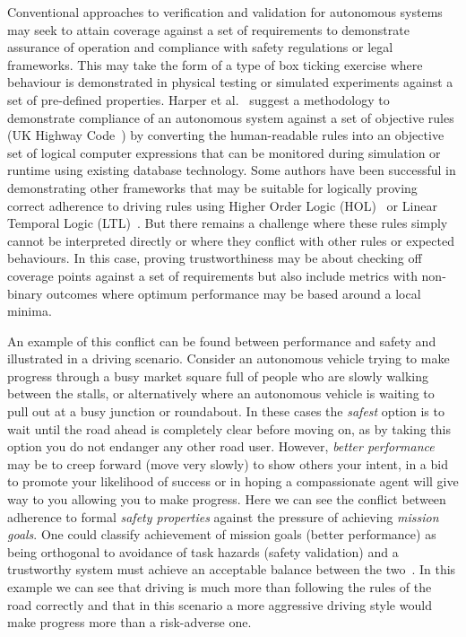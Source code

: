 \documentclass[sigconf]{acmart}
\begin{document}
Conventional approaches to verification and validation for autonomous systems may seek to attain coverage against a set of requirements to demonstrate assurance of operation and compliance with safety regulations or legal frameworks. 
%
This may take the form of a type of box ticking exercise where behaviour is demonstrated in physical testing or simulated experiments against a set of pre-defined properties. 
%
Harper et al.~\cite{harper2021safety} suggest a methodology to demonstrate compliance of an autonomous system against a set of objective rules (UK Highway Code~\cite{highwayCode}) by converting the human-readable rules into an objective set of logical computer expressions that can be monitored during simulation or runtime using existing database technology. 
%
Some authors have been successful in demonstrating other frameworks that may be suitable for logically proving correct adherence to driving rules using Higher Order Logic (HOL)~\cite{rizaldi} or Linear Temporal Logic (LTL)~\cite{esterle2020}. 
%
But there remains a challenge where these rules simply cannot be interpreted directly or where they conflict with other rules or expected behaviours. In this case, proving trustworthiness may be about checking off coverage points against a set of requirements but also include metrics with non-binary outcomes where optimum performance may be based around a local minima.

An example of this conflict can be found between performance and safety and illustrated in a driving scenario. Consider an autonomous vehicle trying to make progress through a busy market square full of people who are slowly walking between the stalls, or alternatively where an autonomous vehicle is waiting to pull out at a busy junction or roundabout. 
%
In these cases the \emph{safest} option is to wait until the road ahead is completely clear before moving on, as by taking this option you do not endanger any other road user. However, \emph{better performance} may be to creep forward (move very slowly) to show others your intent, in a bid to promote your likelihood of success or in hoping a compassionate agent will give way to you allowing you to make progress. 
%
Here we can see the conflict between adherence to formal \emph{safety properties} against the pressure of achieving \emph{mission goals}. 
%
One could classify achievement of mission goals (better performance) as being orthogonal to avoidance of task hazards (safety validation) and a trustworthy system must achieve an acceptable balance between the two~\cite{harper2021safety}.
%
In this example we can see that driving is much more than following the rules of the road correctly and that in this scenario a more aggressive driving style would make progress more than a risk-adverse one. 
\end{document}

